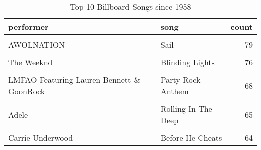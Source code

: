 \begin{table}[H]

\caption{\label{tab:tab:summarystats}Top 10 Billboard Songs since 1958}
\centering
\begin{tabular}[t]{llr}
\toprule
performer & song & count\\
\midrule
\cellcolor{gray!6}{Imagine Dragons} & \cellcolor{gray!6}{Radioactive} & \cellcolor{gray!6}{87}\\
AWOLNATION & Sail & 79\\
\cellcolor{gray!6}{Jason Mraz} & \cellcolor{gray!6}{I'm Yours} & \cellcolor{gray!6}{76}\\
The Weeknd & Blinding Lights & 76\\
\cellcolor{gray!6}{LeAnn Rimes} & \cellcolor{gray!6}{How Do I Live} & \cellcolor{gray!6}{69}\\
\addlinespace
LMFAO Featuring Lauren Bennett \& GoonRock & Party Rock Anthem & 68\\
\cellcolor{gray!6}{OneRepublic} & \cellcolor{gray!6}{Counting Stars} & \cellcolor{gray!6}{68}\\
Adele & Rolling In The Deep & 65\\
\cellcolor{gray!6}{Jewel} & \cellcolor{gray!6}{Foolish Games/You Were Meant For Me} & \cellcolor{gray!6}{65}\\
Carrie Underwood & Before He Cheats & 64\\
\bottomrule
\end{tabular}
\end{table}

